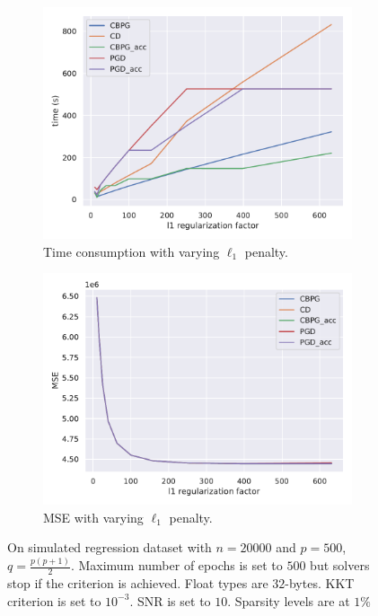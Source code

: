 \documentclass[a4]{article}
\begin{document}
\begin{figure}[ht!]
	\begin{subfigure}{.45\textwidth}
		\centering
		\includegraphics[scale = 0.43]{prebuilt_images/simulated_n20000p500_snr=10_TIME.pdf}
		\caption{Time consumption with varying $\ell_1$ penalty.}
		\label{fig:time_search}
	\end{subfigure}
	\begin{subfigure}{.45\textwidth}
		\centering
		\includegraphics[scale = 0.43]{prebuilt_images/simulated_n20000p500_snr=10_MSE.pdf}
		\caption{MSE with varying $\ell_1$ penalty.}
		\label{fig:mse_search}
	\end{subfigure}
	\caption{On simulated regression dataset with $n=20000$ and $p=500$, $q=\frac{p(p+1)}{2}$.
	Maximum number of epochs is set to $500$ but solvers stop if the criterion is achieved. Float types are $32$-bytes. KKT criterion is set to $10^{-3}$. SNR is set to $10$. Sparsity levels are at $1\%$}
\end{figure}
\end{document}
